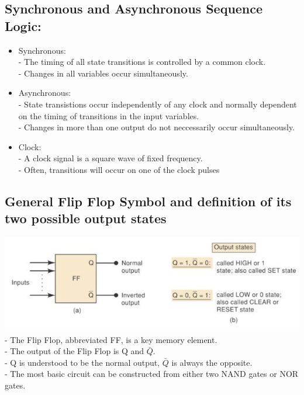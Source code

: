\documentclass[12pt]{article}
\begin{document}
\subsection{Synchronous and Asynchronous Sequence Logic:}
\begin{itemize}
	\item Synchronous: \\
	- The timing of all state transitions is controlled by a common clock. \\
	- Changes in all variables occur simultaneously.
	\item Asynchronous: \\
	- State transistions occur independently of any clock and normally dependent on the timing of transitions in the input variables. \\
	- Changes in more than one output do not neccessarily occur simultaneously.
	\item Clock:\\
	- A clock signal is a square wave of fixed frequency. \\
	- Often, transitions will occur on one of the clock pulses 
\end{itemize}
\subsection{General Flip Flop Symbol and definition of its two possible output states}
\includegraphics[scale = 0.75]{hinh6} \\
- The Flip Flop, abbreviated FF, is a key memory element.\\
- The output of the Flip Flop is Q and $\bar{Q}$. \\
- Q is understood to be the normal output, $\bar{Q}$ is always the opposite. \\
- The most basic circuit can be constructed from either two NAND gates or NOR gates.
\end{document}
